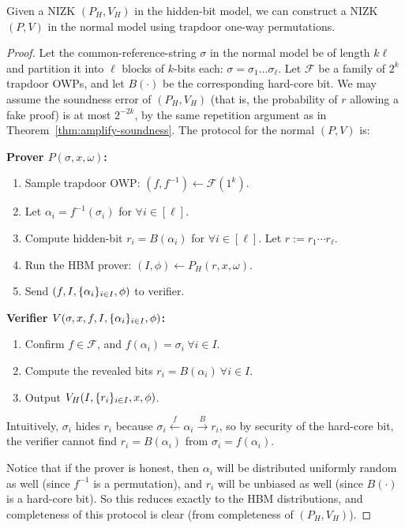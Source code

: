 \begin{theorem}\label{thm:NIZK-amplify}
    Given a NIZK $(P_H, V_H)$ in the hidden-bit model, we can construct a NIZK
    $(P, V)$ in the normal model using trapdoor one-way permutations.
\end{theorem}
\begin{proof}
    Let the common-reference-string $\sigma$ in the normal model be of length $k\ell$ and  partition it
    into $\ell$ blocks of $k$-bits each: $\sigma = \sigma_1\hdots\sigma_\ell$.
    Let $\mathcal{F}$ be a family of $2^k$ trapdoor OWPs, and let $B(\cdot)$
    be the corresponding hard-core bit. We may assume the soundness error
    of $(P_H, V_H)$
    (that is, the probability of $r$ allowing a fake proof)
    is at most $2^{-2k}$, by the same repetition argument as in Theorem~\ref{thm:amplify-soundness}.
    The protocol for the normal $(P, V)$ is:

\medskip
\noindent \textbf{Prover $P(\sigma, x, \omega)$:}
\begin{enumerate}
    \item Sample trapdoor OWP: $(f, f^{-1}) \gets \mathcal{F}(1^k)$.
    \item Let $\alpha_i = f^{-1}(\sigma_i)$ for $\forall i \in [\ell]$.
    \item Compute hidden-bit $r_i = B(\alpha_i)$ for $\forall i \in [\ell]$. Let $r := r_1 \cdots r_\ell$.
    \item Run the HBM prover: $(I, \phi) \gets P_H(r, x, \omega)$.
    \item Send $(f, I, \{\alpha_i\}_{i \in I}, \phi)$ to verifier.
\end{enumerate}

\noindent \textbf{Verifier $V(\sigma, x, f, I, \{\alpha_i\}_{i \in I}, \phi)$:}
\begin{enumerate}
    \item Confirm $f \in \mathcal{F}$, and $f(\alpha_i) = \sigma_i ~\forall i \in I$.
    \item Compute the revealed bits $r_i = B(\alpha_i) ~\forall i \in I$.
    \item Output $V_H(I, \{r_i\}_{i \in I}, x, \phi)$.
\end{enumerate}

Intuitively, $\sigma_i$ hides $r_i$ because $\sigma_i \overset{f}{\gets} \alpha_i
\overset{B}{\to} r_i$, so by security of the hard-core bit, the verifier cannot
find $r_i = B(\alpha_i)$ from $\sigma_i = f(\alpha_i)$.

Notice that if the prover is honest, then $\alpha_i$ will be distributed
uniformly random as well (since $f^{-1}$ is a permutation), and $r_i$ will be
unbiased as well (since $B(\cdot)$ is a hard-core bit). So this reduces exactly
to the HBM distributions, and completeness of this protocol is clear (from completeness of
$(P_H, V_H)$).


\end{proof}
